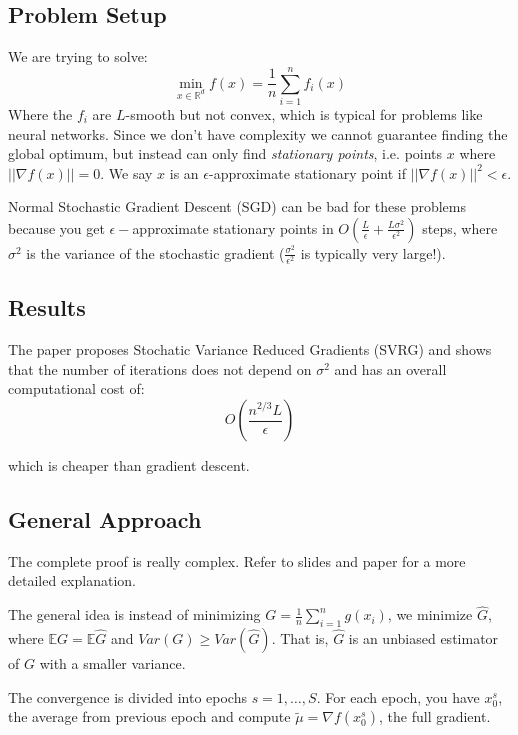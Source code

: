 \documentclass[12pt]{report}
\begin{document}
\subsection{Problem Setup}
We are trying to solve:
\begin{equation}
	\min_{x\in\mathbb{R}^d} f(x) = \frac1n\sum_{i=1}^nf_i(x)
\end{equation}
Where the $f_i$ are $L$-smooth but not convex, which is typical for problems like neural networks.  Since we don't have complexity we cannot guarantee finding the global optimum, but instead can only find \textit{stationary points}, i.e. points $x$ where $||\nabla f(x)|| = 0$. We say $x$ is an $\epsilon$-approximate stationary point if $||\nabla f(x)||^2 < \epsilon$.

Normal Stochastic Gradient Descent (SGD) can be bad for these problems because you get $\epsilon-$approximate stationary points in $O\left(\frac L\epsilon + \frac{L\sigma^2}{\epsilon^2} \right)$ steps, where $\sigma^2$ is the variance of the stochastic gradient ($\frac{\sigma^2}{\epsilon^2}$ is typically very large!).

\subsection{Results}

The paper proposes Stochatic Variance Reduced Gradients (SVRG) and shows that the number of iterations does not depend on $\sigma^2$ and has an overall computational cost of:
\begin{equation}
	O\left( \frac{n^{2/3}L}{\epsilon}\right)
\end{equation}

which is cheaper than gradient descent. 


\subsection{General Approach}
The complete proof is really complex. Refer to slides and paper for a more detailed explanation.

The general idea is instead of minimizing $G=\frac1n \sum_{i=1}^n g(x_i)$, we minimize $\hat{G}$, where $\mathbb{E}G = \mathbb{E}\hat{G}$ and $Var(G) \geq Var(\hat{G})$. That is, $\hat{G}$ is an unbiased estimator of $G$ with a smaller variance.

The convergence is divided into epochs $s = 1, \ldots, S$.
For each epoch, you have $x_0^s$, the average from previous epoch and compute $\tilde{\mu} = \nabla f (x_0^s)$, the full gradient.
\end{document}
